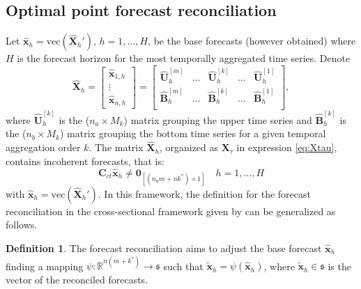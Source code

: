 \documentclass[a4paper,11pt]{article}
\newcommand{\xvet}{\bm{x}}
\newcommand{\Bvet}{\bm{B}}
\newcommand{\Cvet}{\bm{C}}
\newcommand{\Uvet}{\bm{U}}
\newcommand{\Xvet}{\bm{X}}
\newcommand{\Zerovet}{\bm{0}}
\theoremstyle{definition}
\newtheorem{definition}{Definition}[section]
\begin{document}
\subsection{Optimal point forecast reconciliation}\label{ssec:oct}

Let $\widehat{\xvet}_{h} = \mathrm{vec}\left(\widehat{\Xvet}_{h}'\right)$, $h = 1, \dots, H$, be the base forecasts (however obtained) where $H$ is the forecast horizon for the most temporally aggregated time series. Denote
$$
	\widehat{\Xvet}_{h} = \begin{bmatrix}
		\widehat{\xvet}_{1,h} \\
		\vdots                \\
		\widehat{\xvet}_{n,h}
	\end{bmatrix} =\begin{bmatrix}
		\widehat{\Uvet}_{h}^{[m]} & \dots & \widehat{\Uvet}_{h}^{[k]} & \dots & \widehat{\Uvet}_{h}^{[1]} \\[0.25cm]
		\widehat{\Bvet}_{h}^{[m]} & \dots & \widehat{\Bvet}_{h}^{[k]} & \dots & \widehat{\Bvet}_{h}^{[1]} \\\end{bmatrix},
$$
where $\widehat{\Uvet}_{h}^{[k]}$ is the ($n_a\times M_k$) matrix grouping the upper time series and $\widehat{\Bvet}_{h}^{[k]}$ is the ($n_b\times M_k$) matrix grouping the bottom time series for a given temporal aggregation order $k$. The matrix $\widehat{\Xvet}_{h}$, organized as ${\Xvet}_{\tau}$ in expression \eqref{eq:Xtau}, contains incoherent forecasts, that is:
$$
	\Cvet_{ct} \widehat{\xvet}_{h} \neq \Zerovet_{[(n_am+nk^\ast)\times1]} \quad h = 1, \dots, H
$$
with $\widehat{\xvet}_{h} = \mathrm{vec}\left(\widehat{\Xvet}_{h}'\right)$. In this framework, the definition for the forecast reconciliation in the cross-sectional framework given by \cite{panagiotelis2021} can be generalized as follows.
\begin{definition}
	The forecast reconciliation aims to adjust the base forecast $\widehat{\xvet}_{h}$ finding a mapping $\psi: \mathbb{R}^{n(m+k^\ast)} \rightarrow \mathfrak{s}$ such that $\widetilde{\xvet}_{h} = \psi\left(\widehat{\xvet}_{h}\right)$, where $\widetilde{\xvet}_{h} \in \mathfrak{s}$ is the vector of the reconciled forecasts.
\end{definition}
\end{document}
